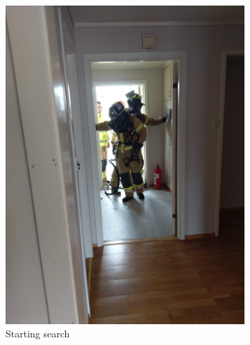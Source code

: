 \documentclass[../Main/thesis.tex]{subfiles}
\begin{document}
\begin{figure}[h]
\begin{subfigure}[t]{0.23\textwidth}
		\includegraphics[width=\textwidth]{../fig/dive2}
		\caption{Starting search}
		\label{fig:eval-dive2}
	\end{subfigure}
	\begin{subfigure}[t]{0.23\textwidth}
		\vskip 0pt

\end{subfigure}
\end{figure}
\end{document}
